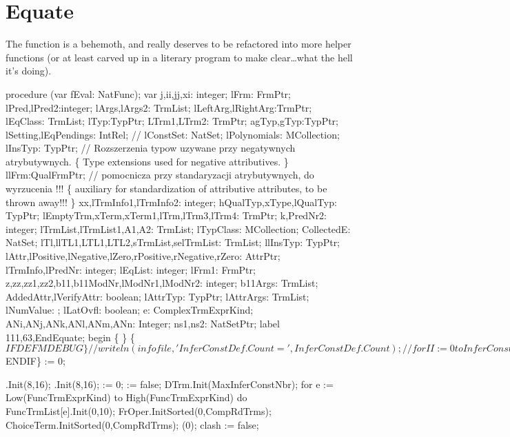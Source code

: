 \section{Equate}

The {\Tt{}\nwendquote} function is a behemoth, and really deserves to be
refactored into more helper functions (or at least carved up in a
literary program to make clear\dots what the hell it's doing).

\nwenddocs{}\endmoddef\nwstartdeflinemarkup\nwenddeflinemarkup
procedure (var fEval: NatFunc);
var
   j,ii,jj,xi: integer;
   lFrm: FrmPtr;
   lPred,lPred2:integer;
   lArgs,lArgs2: TrmList;
   lLeftArg,lRightArg:TrmPtr;
   lEqClass: TrmList;
   lTyp:TypPtr;
   LTrm1,LTrm2: TrmPtr;
   agTyp,gTyp:TypPtr;
   lSetting,lEqPendings: IntRel;
// lConstSet: NatSet;
   lPolynomials: MCollection;
   lInsTyp: TypPtr; // Rozszerzenia typow uzywane przy negatywnych atrybutywnych.
                    \{ Type extensions used for negative attributives. \}
   llFrm:QualFrmPtr; // pomocnicza przy standaryzacji atrybutywnych, do wyrzucenia !!!
   \{ auxiliary for standardization of attributive attributes, to be thrown away!!! \}
   xx,lTrmInfo1,lTrmInfo2: integer;
   hQualTyp,xType,lQualTyp: TypPtr;
   lEmptyTrm,xTerm,xTerm1,lTrm,lTrm3,lTrm4: TrmPtr;
   k,PredNr2: integer;
   lTrmList,lTrmList1,A1,A2: TrmList;
   lTypClass: MCollection;
   CollectedE: NatSet;
   lTl,llTL1,LTL1,LTL2,sTrmList,selTrmList: TrmList;
   llInsTyp: TypPtr;
   lAttr,lPositive,lNegative,lZero,rPositive,rNegative,rZero: AttrPtr;
   lTrmInfo,lPredNr: integer;
   lEqList: integer;
   lFrm1: FrmPtr;
   z,zz,zz1,zz2,b11,b11ModNr,lModNr1,lModNr2: integer;
   b11Args: TrmList;
   AddedAttr,lVerifyAttr: boolean;
   lAttrTyp: TypPtr;
   lAttrArgs: TrmList;
   lNumValue: ;
   lLatOvfl: boolean;
   e: ComplexTrmExprKind;
   ANi,ANj,ANk,ANl,ANm,ANn: Integer;
   ns1,ns2: NatSetPtr;
label 111,63,EndEquate;
begin \{  \}
   \{$IFDEF MDEBUG\}
   //writeln(infofile,'InferConstDef.Count=',InferConstDef.Count);
   //for II := 0 to InferConstDef.Count-1 do InfoInferConstDef(II);
   \{$ENDIF\}
    := 0;
   
   .Init(8,16); .Init(8,16);
    := 0;
    := false;
   DTrm.Init(MaxInferConstNbr);
   for e := Low(FuncTrmExprKind) to High(FuncTrmExprKind) do
      FuncTrmList[e].Init(0,10);
   FrOper.InitSorted(0,CompRdTrms);
   ChoiceTerm.InitSorted(0,CompRdTrms);
   (0); clash := false;

